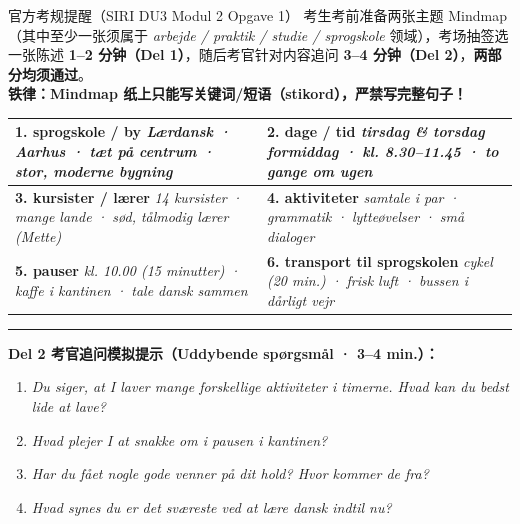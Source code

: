 \begin{tipbox}{官方考规提醒（SIRI DU3 Modul 2 Opgave 1）}
\small
{} 考生考前准备两张主题 Mindmap（其中至少一张须属于 \textit{arbejde / praktik / studie / sprogskole} 领域），考场抽签选一张陈述 \textbf{1--2 分钟（Del 1）}，随后考官针对内容追问 \textbf{3--4 分钟（Del 2）}，\textbf{两部分均须通过}。\\
 \textbf{铁律：Mindmap 纸上只能写关键词/短语（stikord），严禁写完整句子！}
\end{tipbox}

\begin{tcolorbox}[enhanced, breakable, colback=NCDBgBlue, colframe=NCDNavy, coltitle=white, fonttitle=\bfseries, title={Mindmap 2A：Min sprogskole（官方六大分支 · 仅限 Stikord）}, arc=3pt, boxrule=0.8pt, left=10pt, right=10pt, top=7pt, bottom=7pt]
\small
\renewcommand{\arraystretch}{1.35}
\begin{tabularx}{\linewidth}{@{} >{\raggedright\arraybackslash}p{8.0cm} >{\raggedright\arraybackslash}X @{}}
\textbf{\color{NCDNavy}1. sprogskole / by}\newline
\textit{Lærdansk · Aarhus · tæt på centrum · stor, moderne bygning}
&
\textbf{\color{NCDNavy}2. dage / tid}\newline
\textit{tirsdag \& torsdag formiddag · kl. 8.30--11.45 · to gange om ugen}
\\
\midrule
\textbf{\color{NCDNavy}3. kursister / lærer}\newline
\textit{14 kursister · mange lande · sød, tålmodig lærer (Mette)}
&
\textbf{\color{NCDNavy}4. aktiviteter}\newline
\textit{samtale i par · grammatik · lytteøvelser · små dialoger}
\\
\midrule
\textbf{\color{NCDNavy}5. pauser}\newline
\textit{kl. 10.00 (15 minutter) · kaffe i kantinen · tale dansk sammen}
&
\textbf{\color{NCDNavy}6. transport til sprogskolen}\newline
\textit{cykel (20 min.) · frisk luft · bussen i dårligt vejr}
\\
\end{tabularx}
\vspace{0.4em}
\hrule
\vspace{0.4em}
\textbf{\color{NCDRed}Del 2 考官追问模拟提示（Uddybende spørgsmål · 3--4 min.）：}
\begin{enumerate}
  \item \textit{Du siger, at I laver mange forskellige aktiviteter i timerne. Hvad kan du bedst lide at lave?}
  \item \textit{Hvad plejer I at snakke om i pausen i kantinen?}
  \item \textit{Har du fået nogle gode venner på dit hold? Hvor kommer de fra?}
  \item \textit{Hvad synes du er det sværeste ved at lære dansk indtil nu?}
\end{enumerate}
\end{tcolorbox}


